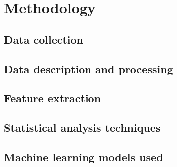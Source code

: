 \chapter{Methodology}
    \section{Data collection}
        
    \section{Data description and processing}
    \section{Feature extraction}
    \section{Statistical analysis techniques}
    \section{Machine learning models used}